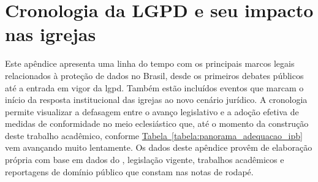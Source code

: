 \chapter{Cronologia da LGPD e seu impacto nas igrejas}
\label{apendice:cronologia-lgpd}

Este apêndice apresenta uma linha do tempo com os principais marcos legais relacionados à proteção de dados no Brasil, desde os primeiros debates públicos até a entrada em vigor da \gls{lgpd}.  Também estão incluídos eventos que marcam o início da resposta institucional das igrejas ao novo cenário jurídico. A cronologia permite visualizar a defasagem entre o avanço legislativo e a adoção efetiva de medidas de conformidade no meio eclesiástico que, até o momento da construção deste trabalho acadêmico, conforme \hyperref[tabela:panorama_adequacao_ipb]{Tabela~\ref*{tabela:panorama_adequacao_ipb}} vem avançando muito lentamente. Os dados deste apêndice provêm de elaboração própria com base em dados do , legislação vigente, trabalhos acadêmicos e reportagens de domínio público que constam nas notas de rodapé.

